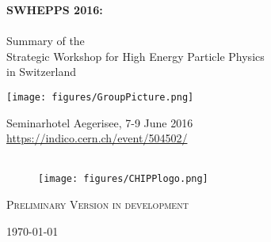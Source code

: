 \documentclass[10pt,a4paper]{article}
\begin{document}
\addtocounter{page}{-1}
\pagestyle{plain}
\begin{center}
{\large {\bf  SWHEPPS 2016:}\\
\ ~\\
Summary of the\\
 Strategic Workshop for High Energy Particle Physics \\
  in Switzerland }\\
\vspace{2cm}

 \texttt{[image: figures/GroupPicture.png]}
 
\vspace{6cm}

Seminarhotel Aegerisee, 7-9 June 2016 \\
\url{https://indico.cern.ch/event/504502/}  ~\\
\  ~\\


\vspace {-0.5cm}
 \begin{figure}[h]
   \centering
   \texttt{[image: figures/CHIPPlogo.png]}
 \end{figure}

\vspace{-0.6cm}
{\textsc {Preliminary Version in development}}

\today \\
\end{center}
\newpage 

%



%


%


%


%

\end{document}

